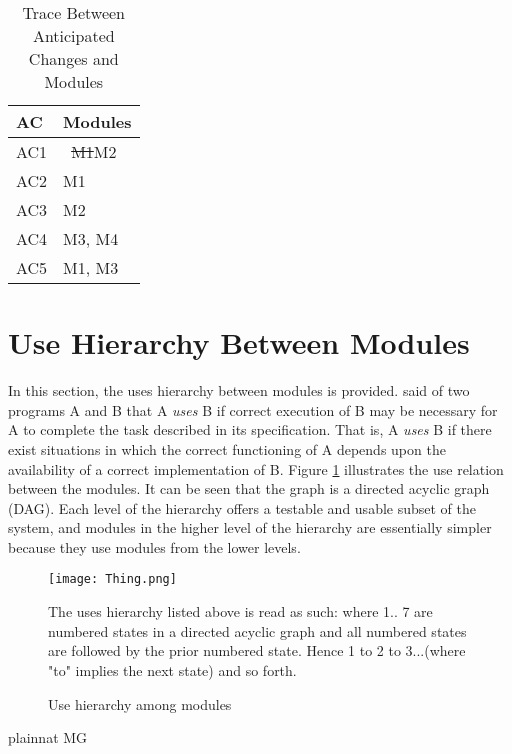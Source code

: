 \documentclass[12pt, titlepage]{article}
\newcommand{\rev}[1]{\textcolor{RevisionColour}{#1}}
\begin{document}
\begin{table}[H]
\centering
\begin{tabular}{p{} p{}}
\toprule
\textbf{AC} & \textbf{Modules}\\
\midrule
AC1 & \ \sout{M1}\rev{M2}\\
\rev{AC2} & \rev{M1}\\
\rev{AC3} & \rev{M2}\\
\rev{AC4} & \rev{M3, M4}\\
\rev{AC5} & \rev{M1, M3}\\
\bottomrule
\end{tabular}
\caption{Trace Between Anticipated Changes and Modules}
\label{TblACT}
\end{table}

\section{Use Hierarchy Between Modules} \label{SecUse}

In this section, the uses hierarchy between modules is
provided. \citet{Parnas1978} said of two programs A and B that A {\em uses} B if
correct execution of B may be necessary for A to complete the task described in
its specification. That is, A {\em uses} B if there exist situations in which
the correct functioning of A depends upon the availability of a correct
implementation of B.  Figure \ref{FigUH} illustrates the use relation between
the modules. It can be seen that the graph is a directed acyclic graph
(DAG). Each level of the hierarchy offers a testable and usable subset of the
system, and modules in the higher level of the hierarchy are essentially simpler
because they use modules from the lower levels.

\begin{figure}[H]
\centering
\texttt{[image: Thing.png]}
\caption{Use hierarchy among modules}
\rev{The uses hierarchy listed above is read as such: where 1.. 7 are numbered states in a directed acyclic graph and all numbered states are followed by the prior numbered state. Hence 1 to 2 to 3...(where "to" implies the next state) and so forth. }
\label{FigUH}
\end{figure}


 {plainnat}
 {MG}
\end{document}

